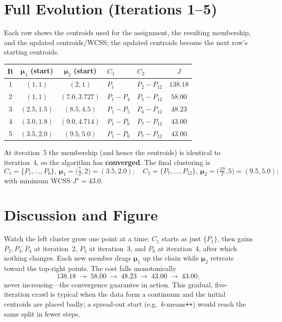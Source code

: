 \documentclass[11pt,a4paper]{report}
\theoremstyle{definition}
\theoremstyle{plain}
\theoremstyle{remark}
\newcommand{\vmu}{\bm{\mu}}
\begin{document}
	\section{Full Evolution (Iterations 1--5)}
	Each row shows the centroids used for the assignment, the resulting membership,
	and the updated centroids/WCSS; the updated centroids become the next row's
	starting centroids.
	\begin{center}
	\small
	\setlength{\tabcolsep}{4pt}
	\begin{tabular}{@{}c cc l l c@{}}
	\toprule
	It & $\vmu_1$ (start) & $\vmu_2$ (start) & $C_1$ & $C_2$ & $J$\\
	\midrule
	1 & $(1,1)$      & $(2,1)$        & $P_1$          & $P_2\!-\!P_{12}$ & $138.18$\\
	2 & $(1,1)$      & $(7.0,3.727)$  & $P_1\!-\!P_4$   & $P_5\!-\!P_{12}$ & $58.00$\\
	3 & $(2.5,1.5)$  & $(8.5,4.5)$    & $P_1\!-\!P_5$   & $P_6\!-\!P_{12}$ & $48.23$\\
	4 & $(3.0,1.8)$  & $(9.0,4.714)$  & $P_1\!-\!P_6$   & $P_7\!-\!P_{12}$ & $43.00$\\
	5 & $(3.5,2.0)$  & $(9.5,5.0)$    & $P_1\!-\!P_6$   & $P_7\!-\!P_{12}$ & $43.00$\\
	\bottomrule
	\end{tabular}
	\end{center}
	At iteration~5 the membership (and hence the centroids) is identical to
	iteration~4, so the algorithm has \textbf{converged}. The final clustering is
	\[
	C_1=\{P_1,\dots,P_6\},\ \vmu_1=\bigl(\tfrac{7}{2},2\bigr)=(3.5,2.0);
	\quad
	C_2=\{P_7,\dots,P_{12}\},\ \vmu_2=\bigl(\tfrac{19}{2},5\bigr)=(9.5,5.0);
	\]
	with minimum WCSS $J^\star=43.0$.
	
	\section{Discussion and Figure}
	Watch the left cluster grow one point at a time: $C_1$ starts as just $\{P_1\}$,
	then gains $P_2,P_3,P_4$ at iteration~2, $P_5$ at iteration~3, and $P_6$ at
	iteration~4, after which nothing changes. Each new member drags $\vmu_1$ up the
	chain while $\vmu_2$ retreats toward the top-right points. The cost falls
	monotonically
	\[
	138.18\;\to\;58.00\;\to\;48.23\;\to\;43.00\;\to\;43.00,
	\]
	never increasing---the convergence guarantee in action. This gradual,
	five-iteration crawl is typical when the data form a continuum and the initial
	centroids are placed badly; a spread-out start (e.g.\ $k$-means\texttt{++})
	would reach the same split in fewer steps.
	
\end{document}
